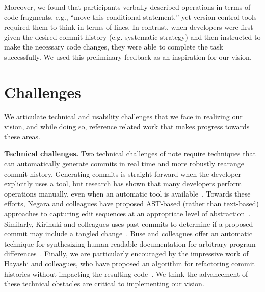\documentclass[conference]{IEEEtran}
\begin{document}
Moreover, we found that participants verbally described operations in terms of code fragments, e.g., ``move this conditional statement,'' yet version control tools required them to think in terms of lines. 
In contrast, when developers were first given the desired commit history (e.g. systematic strategy) and then instructed to make the necessary code changes, they were able to complete the task successfully. 
We used this preliminary feedback as an inspiration for our vision.

\section{Challenges}
\label{sec:challenges}
We articulate technical and usability challenges that we face in realizing our vision, and while doing so, reference related work that makes progress towards these areas.  

\textbf{Technical challenges.} Two technical challenges of note require techniques that can automatically generate commits in real time and more robustly rearange commit history.
Generating commits is straight forward when the developer explicitly uses a tool, but research has shown that many developers perform operations manually, even when an automatic tool is available~\cite{Murphy-Hill2012c}.
Towards these efforts, Negara and colleagues have proposed AST-based (rather than text-based) approaches to capturing edit sequences at an appropriate level of abstraction~\cite{Negara2012}. Similarly, Kirinuki and colleagues uses past commits to determine if a proposed commit may include a tangled change~\cite{Kirinuki2014}. 
Buse and colleagues offer an automatic technique for synthesizing human-readable documentation for arbitrary program differences~\cite{Buse2010}.
Finally, we are particularly encouraged by the impressive work of Hayashi and colleagues, who have proposed an algorithm for refactoring commit histories without impacting the resulting code~\cite{Hayashi2012}. 
We think the advancement of these technical obstacles are critical to implementing our vision.
\end{document}
